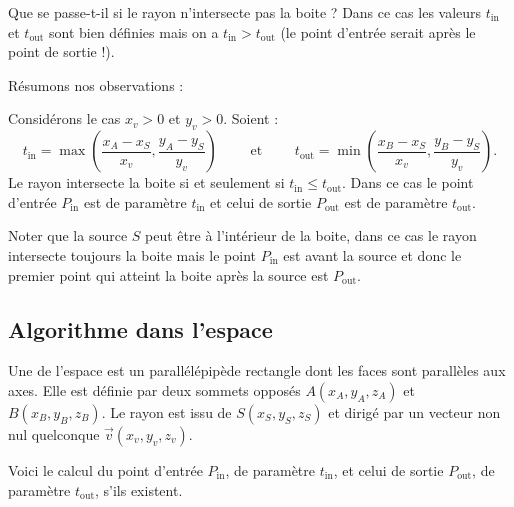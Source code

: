 \documentclass[11pt,class=report,crop=false]{standalone}
\begin{document}
Que se passe-t-il si le rayon n'intersecte pas la boite ? Dans ce cas les valeurs 
$t_{\text{in}}$ et $t_{\text{out}}$ sont bien définies mais on a $t_{\text{in}} > t_{\text{out}}$ (le point d'entrée serait après le point de sortie !).



Résumons nos observations :
\begin{proposition}
Considérons le cas $x_v>0$ et $y_v>0$.
Soient :
$$
t_{\text{in}} = \max\left(\frac{x_A-x_S}{x_v},\frac{y_A-y_S}{y_v}\right)
\qquad \text{ et } \qquad
t_{\text{out}} = \min\left(\frac{x_B-x_S}{x_v},\frac{y_B-y_S}{y_v}\right).$$
Le rayon intersecte la boite si et seulement si $t_{\text{in}} \le t_{\text{out}}$.
Dans ce cas le point d'entrée $P_{\text{in}}$ est de paramètre 
$t_{\text{in}}$ et celui de sortie $P_{\text{out}}$ est de paramètre 
$t_{\text{out}}$.
\end{proposition}

Noter que la source $S$ peut être à l'intérieur de la boite, dans ce cas le rayon intersecte toujours la boite mais le point $P_{\text{in}}$ est avant la source et donc le premier point qui atteint la boite après la source est $P_{\text{out}}$.


\subsection{Algorithme dans l'espace}
 Une  de l'espace est un parallélépipède rectangle dont les faces sont parallèles aux axes. Elle est définie par deux sommets opposés $A(x_A,y_A,z_A)$ et $B(x_B,y_B,z_B)$.
Le rayon est issu de $S(x_S,y_S,z_S)$ et dirigé par un vecteur non nul quelconque $\vec v(x_v,y_v,z_v)$.


Voici le calcul du point d'entrée $P_{\text{in}}$, de paramètre 
$t_{\text{in}}$, et celui de sortie $P_{\text{out}}$, de paramètre 
$t_{\text{out}}$, s'ils existent.
\end{document}
